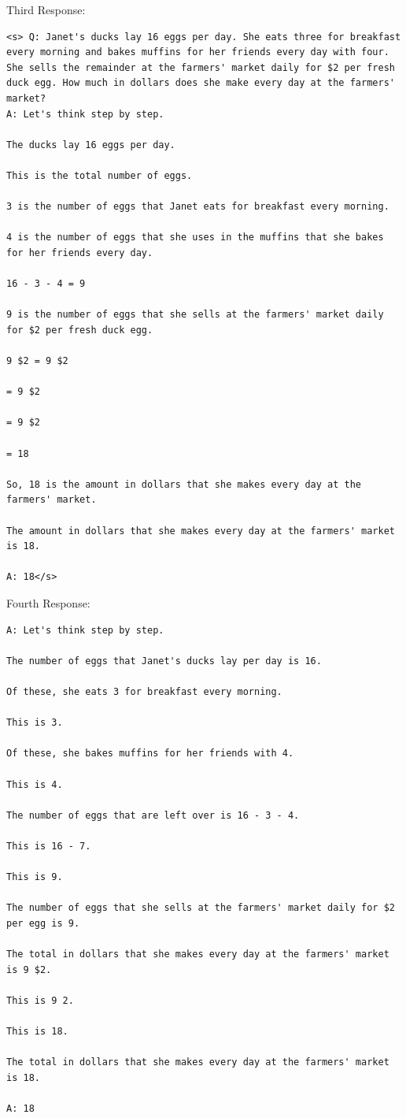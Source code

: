 \documentclass{article} %
\begin{document}
\vspace{10px}
Third Response:
\begin{lstlisting}
<s> Q: Janet's ducks lay 16 eggs per day. She eats three for breakfast every morning and bakes muffins for her friends every day with four. She sells the remainder at the farmers' market daily for $2 per fresh duck egg. How much in dollars does she make every day at the farmers' market?
A: Let's think step by step.

The ducks lay 16 eggs per day.

This is the total number of eggs.

3 is the number of eggs that Janet eats for breakfast every morning.

4 is the number of eggs that she uses in the muffins that she bakes for her friends every day.

16 - 3 - 4 = 9

9 is the number of eggs that she sells at the farmers' market daily for $2 per fresh duck egg.

9 $2 = 9 $2

= 9 $2

= 9 $2

= 18

So, 18 is the amount in dollars that she makes every day at the farmers' market.

The amount in dollars that she makes every day at the farmers' market is 18.

A: 18</s>
\end{lstlisting}

\vspace{10px}
Fourth Response:
\begin{lstlisting}
A: Let's think step by step.

The number of eggs that Janet's ducks lay per day is 16.

Of these, she eats 3 for breakfast every morning.

This is 3.

Of these, she bakes muffins for her friends with 4.

This is 4.

The number of eggs that are left over is 16 - 3 - 4.

This is 16 - 7.

This is 9.

The number of eggs that she sells at the farmers' market daily for $2 per egg is 9.

The total in dollars that she makes every day at the farmers' market is 9 $2.

This is 9 2.

This is 18.

The total in dollars that she makes every day at the farmers' market is 18.

A: 18
\end{lstlisting}
\end{document}
